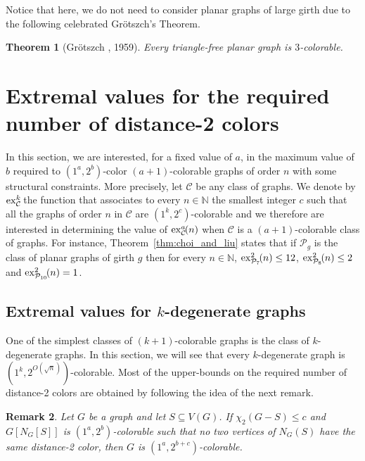 \documentclass{article}
\newtheorem{theorem}{Theorem}
\newtheorem{remark}[theorem]{Remark}
\newcommand{\colo}[2]{(1^{#1}, 2^{#2})}
\newcommand{\ex}[3]{\operatorname{ex}^{#1}_{#2}\hspace{-3pt}{#3}}
\begin{document}
Notice that here, we do not need to consider planar graphs of large girth due to the following celebrated Grötszch's Theorem.
\begin{theorem}[Grötszch \cite{grunbaum1963grotzsch, thomassen2003short}, 1959]\label{thm:grotzcsh_thm}
    Every triangle-free planar graph is $3$-colorable.
\end{theorem}

\section{Extremal values for the required number of distance-2 colors}\label{sec:extr_values}

In this section, we are interested, for a fixed value of $a$, in the maximum value of $b$ required to $\colo{a}{b}$-color $(a + 1)$-colorable graphs of order $n$ with some structural constraints. More precisely, let $\mathcal{C}$ be any class of graphs. We denote by  $\ex{k}{\mathcal{C}}{}$ the function that associates to every $n \in \mathbb{N}$ the smallest integer $c$ such that all the graphs of order $n$ in $\mathcal{C}$ are $\colo{k}{c}$-colorable and we therefore are interested in determining the value of $\ex{a}{\mathcal{C}}{(n)}$ when $\mathcal{C}$ is a $(a + 1)$-colorable class of graphs. For instance, Theorem~\ref{thm:choi_and_liu} states that if $\mathcal{P}_g$ is the class of planar graphs of girth $g$ then for every $n \in \mathbb{N}$, $\ex{2}{\mathcal{P}_7}{(n)} \leq 12$, $\ex{2}{\mathcal{P}_8}{(n)} \leq 2$ and $\ex{2}{\mathcal{P}_{10}}{(n)} = 1$. 

\subsection{Extremal values for $k$-degenerate graphs}

One of the simplest classes of $(k + 1)$-colorable graphs is the class of $k$-degenerate graphs. In this section, we will see that every $k$-degenerate graph is $\colo{k}{O(\sqrt{n})}$-colorable. Most of the upper-bounds on the required number of distance-2 colors are obtained by following the idea of the next remark.

\begin{remark}\label{rem:colo_strat}
    Let $G$ be a graph and let $S \subseteq V(G)$. If $\chi_2(G - S) \le c$ and $G[N_G[S]]$ is $\colo{a}{b}$-colorable such that no two vertices of $N_G(S)$ have the same distance-2 color, then $G$ is $\colo{a}{b + c}$-colorable.
\end{remark}
\end{document}
